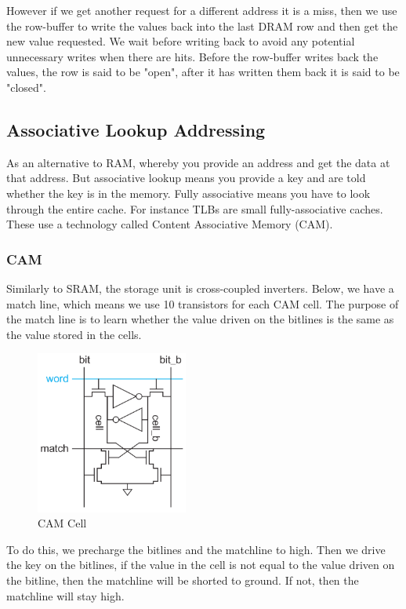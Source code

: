 \documentclass{article}
\begin{document}
However if we get another request for a different address it is a miss, then we use the row-buffer to write the values back into the last DRAM row and then get the new value requested. We wait before writing back to avoid any potential unnecessary writes when there are hits. Before the row-buffer writes back the values, the row is said to be "open", after it has written them back it is said to be "closed". 




\subsection{Associative Lookup Addressing}

As an alternative to RAM, whereby you provide an address and get the data at that address. But associative lookup means you provide a key and are told whether the key is in the memory. Fully associative means you have to look through the entire cache. For instance TLBs are small fully-associative caches. These use a technology called Content Associative Memory (CAM). 

\subsubsection{CAM}

Similarly to SRAM, the storage unit is cross-coupled inverters. Below, we have a match line, which means we use 10 transistors for each CAM cell. The purpose of the match line is to learn whether the value driven on the bitlines is the same as the value stored in the cells. 


\begin{figure}[ht!]
\centering
\includegraphics[width=50mm]{img/CAM.png}
\caption{CAM Cell}
\end{figure}


To do this, we precharge the bitlines and the matchline to high. Then we drive the key on the bitlines, if the value in the cell is not equal to the value driven on the bitline, then the matchline will be shorted to ground. If not, then the matchline will stay high. 
\end{document}
